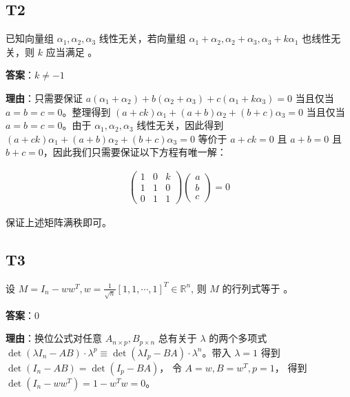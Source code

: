 \documentclass{article}
\begin{document}
\subsection{T2}

\par 已知向量组 $\alpha_1, \alpha_2, \alpha_3$ 线性无关，若向量组 $\alpha_1+\alpha_2, \alpha_2+\alpha_3, \alpha_3+k\alpha_1$ 也线性无关，则 $k$ 应当满足 \underline{\phantom{empty\_space}}。

\par \textbf{答案}：$k\neq -1$

\par \textbf{理由}：只需要保证 $a(\alpha_1+\alpha_2) + b(\alpha_2+\alpha_3)+c(\alpha_1+k\alpha_3)=0$ 当且仅当 $a=b=c=0$。整理得到 $(a+ck)\alpha_1 + (a+b)\alpha_2 + (b+c)\alpha_3=0$ 当且仅当 $a=b=c=0$。由于 $\alpha_1, \alpha_2, \alpha_3$ 线性无关，因此得到 $(a+ck)\alpha_1 + (a+b)\alpha_2 + (b+c)\alpha_3=0$ 等价于 $a+ck=0$ 且 $a+b=0$ 且 $b+c=0$，因此我们只需要保证以下方程有唯一解：

\begin{align*}
	\begin{pmatrix}
		1 & 0 & k\\
		1 & 1 & 0\\
		0 & 1 & 1
	\end{pmatrix} \begin{pmatrix}
		a\\b\\c
	\end{pmatrix}=0
\end{align*}

保证上述矩阵满秩即可。

\subsection{T3}

\par 设 $M=I_n - ww^T, w=\frac{1}{\sqrt n}[ 1, 1, \cdots, 1]^T \in \mathbb R^n$, 则 $M$ 的行列式等于 \underline{\phantom{empty\_space}}。

\par \textbf{答案}：0

\par \textbf{理由}：换位公式对任意 $A_{n\times p}, B_{p\times n}$ 总有关于 $\lambda$ 的两个多项式 $\det(\lambda I_n - AB) \cdot \lambda^p \equiv \det(\lambda I_p - BA) \cdot \lambda^n $。带入 $\lambda = 1$ 得到 $\det(I_n - AB) = \det(I_p - BA)$， 令 $A=w, B=w^T, p=1$， 得到 $\det(I_n - ww^T)=1 - w^Tw=0$。
\end{document}
